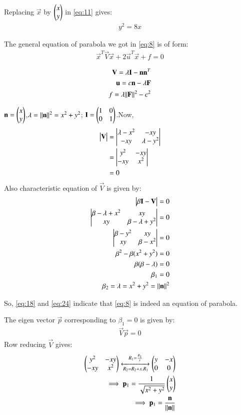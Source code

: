 \documentclass[journal,12pt,twocolumn]{IEEEtran}
\begin{document}
Replacing $\vec{x}$ by $\begin{pmatrix}x\\y\end{pmatrix}$ in \eqref{eq:11} gives:
\begin{align}
y^2=8x
\end{align}

The general equation of parabola we got in \eqref{eq:8} is of form:
\begin{align}
\vec{x}^T\vec{V}\vec{x}+2\vec{u}^T\vec{x}+f=0
\end{align}

\begin{align}
\mathbf{V}=\lambda\mathbf{I}-\mathbf{n}\mathbf{n}^T\\
\mathbf{u}=c\mathbf{n}-\lambda\mathbf{F}\\
f=\lambda\Vert\mathbf{F}\rVert^2-c^2
\end{align}

$\mathbf{n}=\begin{pmatrix}x\\y\end{pmatrix}$,$\lambda=\Vert\mathbf{n}\rVert^2=x^2+y^2$; $\mathbf{I}=\begin{pmatrix}1&0\\0&1\end{pmatrix}$.Now,
\begin{align}
\begin{vmatrix}\mathbf{V}\end{vmatrix}&=\begin{vmatrix}\lambda-x^2&-xy\\-xy&\lambda-y^2\end{vmatrix}\\
&=\begin{vmatrix}y^2&-xy\\-xy&x^2\end{vmatrix}\\
&=0\label{eq:18}
\end{align}
Also characteristic equation of $\vec{V}$ is given by:
\begin{align}
\begin{vmatrix}\beta\mathbf{I}-\mathbf{V}\end{vmatrix}=0\\
\begin{vmatrix}\beta-\lambda+x^2&xy\\xy&\beta-\lambda+y^2\end{vmatrix}=0\\
\begin{vmatrix}\beta-y^2&xy\\xy&\beta-x^2\end{vmatrix}=0\\
\beta^2-\beta(x^2+y^2)=0\\
\beta(\beta-\lambda)=0\\
\beta_{1}=0\\\label{eq:24}
\beta_{2}=\lambda=x^2+y^2=\Vert\mathbf{n}\rVert^2
\end{align}

So, \eqref{eq:18} and \eqref{eq:24} indicate that \eqref{eq:8} is indeed an equation of parabola.

The eigen vector $\vec{p}$ corresponding to $\beta_{1}=0$ is given by:
\begin{align}
\vec{V}\vec{p}=0
\end{align}
Row reducing $\vec{V}$ gives:
\begin{align}
\begin{pmatrix}y^2&-xy\\-xy&x^2\end{pmatrix}\xleftrightarrow[R_2=R_2+x.R_1]{R_1=\frac{R_1}{y}}\begin{pmatrix}y&-x\\0&0\end{pmatrix}\\
\implies\mathbf{p}_{1}=\frac{1}{\sqrt{x^2+y^2}}\begin{pmatrix}x\\y\end{pmatrix}\\
\implies\mathbf{p}_{1}=\frac{\mathbf{n}}{\Vert\mathbf{n}\rVert}
\end{align}
\end{document}
